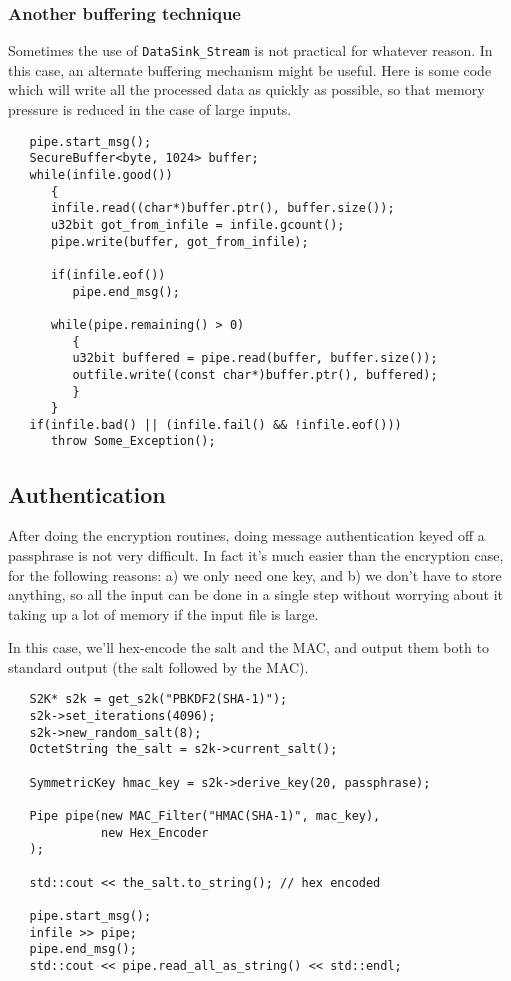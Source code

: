 \documentclass{article}
\newcommand{\type}[1]{\texttt{#1}}
\begin{document}
\subsubsection{Another buffering technique}

Sometimes the use of \type{DataSink\_Stream} is not practical for whatever
reason. In this case, an alternate buffering mechanism might be useful. Here is
some code which will write all the processed data as quickly as possible, so
that memory pressure is reduced in the case of large inputs.

\begin{verbatim}
   pipe.start_msg();
   SecureBuffer<byte, 1024> buffer;
   while(infile.good())
      {
      infile.read((char*)buffer.ptr(), buffer.size());
      u32bit got_from_infile = infile.gcount();
      pipe.write(buffer, got_from_infile);

      if(infile.eof())
         pipe.end_msg();

      while(pipe.remaining() > 0)
         {
         u32bit buffered = pipe.read(buffer, buffer.size());
         outfile.write((const char*)buffer.ptr(), buffered);
         }
      }
   if(infile.bad() || (infile.fail() && !infile.eof()))
      throw Some_Exception();
\end{verbatim}

\pagebreak

\subsection{Authentication}

After doing the encryption routines, doing message authentication keyed off a
passphrase is not very difficult. In fact it's much easier than the encryption
case, for the following reasons: a) we only need one key, and b) we don't have
to store anything, so all the input can be done in a single step without
worrying about it taking up a lot of memory if the input file is large.

In this case, we'll hex-encode the salt and the MAC, and output them both to
standard output (the salt followed by the MAC).

\begin{verbatim}
   S2K* s2k = get_s2k("PBKDF2(SHA-1)");
   s2k->set_iterations(4096);
   s2k->new_random_salt(8);
   OctetString the_salt = s2k->current_salt();

   SymmetricKey hmac_key = s2k->derive_key(20, passphrase);

   Pipe pipe(new MAC_Filter("HMAC(SHA-1)", mac_key),
             new Hex_Encoder
   );

   std::cout << the_salt.to_string(); // hex encoded

   pipe.start_msg();
   infile >> pipe;
   pipe.end_msg();
   std::cout << pipe.read_all_as_string() << std::endl;
\end{verbatim}
\end{document}
